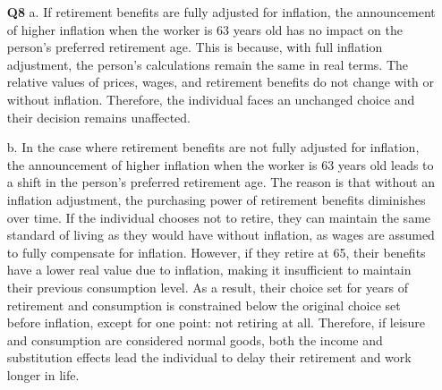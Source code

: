 \documentclass[12pt]{article}
\begin{document}
\begin{enumerate}
    \item[\textbf{Q8}] 
    a. If retirement benefits are fully adjusted for inflation, the announcement of higher inflation when the worker is 63 years old has no impact on the person's preferred retirement age. This is because, with full inflation adjustment, the person's calculations remain the same in real terms. The relative values of prices, wages, and retirement benefits do not change with or without inflation. Therefore, the individual faces an unchanged choice and their decision remains unaffected.

    b. In the case where retirement benefits are not fully adjusted for inflation, the announcement of higher inflation when the worker is 63 years old leads to a shift in the person's preferred retirement age. The reason is that without an inflation adjustment, the purchasing power of retirement benefits diminishes over time. If the individual chooses not to retire, they can maintain the same standard of living as they would have without inflation, as wages are assumed to fully compensate for inflation. However, if they retire at 65, their benefits have a lower real value due to inflation, making it insufficient to maintain their previous consumption level. As a result, their choice set for years of retirement and consumption is constrained below the original choice set before inflation, except for one point: not retiring at all. Therefore, if leisure and consumption are considered normal goods, both the income and substitution effects lead the individual to delay their retirement and work longer in life.
\end{enumerate}
\end{document}
